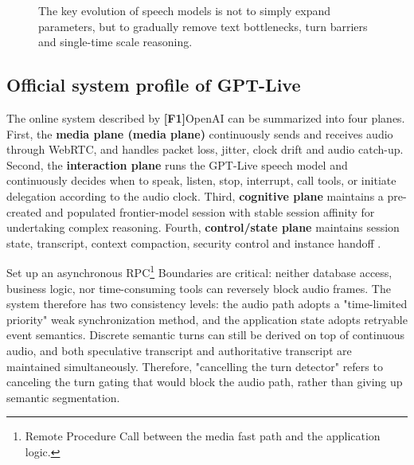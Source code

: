 \documentclass[UTF8,fontset=none,a4paper,10pt]{ctexart}
\newcommand{\FOne}{\textcolor{official}{\textbf{[F1]}}}
\begin{document}
\begin{figure}[H]
\centering
{}
\caption{The key evolution of speech models is not to simply expand parameters, but to gradually remove text bottlenecks, turn barriers and single-time scale reasoning.}
\label{en:fig:evolution}
\end{figure}

\subsection{Official system profile of GPT-Live}

The online system described by \FOne OpenAI can be summarized into four planes. First, the \textbf{ media plane (media plane) } continuously sends and receives audio through WebRTC, and handles packet loss, jitter, clock drift and audio catch-up. Second, the \textbf{ interaction plane } runs the GPT-Live speech model and continuously decides when to speak, listen, stop, interrupt, call tools, or initiate delegation according to the audio clock. Third, \textbf{ cognitive plane } maintains a pre-created and populated frontier-model session with stable session affinity for undertaking complex reasoning. Fourth, \textbf{ control/state plane } maintains session state, transcript, context compaction, security control and instance handoff \cite{en:openai2026continuous,en:openai2026safety}.

Set up an asynchronous RPC\footnote{Remote Procedure Call between the media fast path and the application logic. } Boundaries are critical: neither database access, business logic, nor time-consuming tools can reversely block audio frames. The system therefore has two consistency levels: the audio path adopts a "time-limited priority" weak synchronization method, and the application state adopts retryable event semantics. Discrete semantic turns can still be derived on top of continuous audio, and both speculative transcript and authoritative transcript are maintained simultaneously. Therefore, "cancelling the turn detector" refers to canceling the turn gating that would block the audio path, rather than giving up semantic segmentation.
\end{document}
